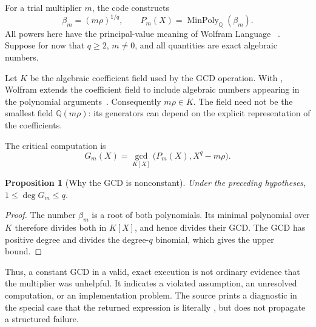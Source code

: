 \documentclass[11pt,letterpaper]{article}
\newcommand{\code}[1]{\texttt{\detokenize{#1}}}
\newcommand{\Q}{\mathbb{Q}}
\newtheorem{proposition}{Proposition}[section]
\theoremstyle{definition}
\begin{document}
For a trial multiplier $m$, the code constructs
\begin{equation}
  \beta_m=(m\rho)^{1/q},
  \qquad P_m(X)=\operatorname{MinPoly}_{\Q}(\beta_m).
  \label{eq:beta}
\end{equation}
All powers here have the principal-value meaning of Wolfram Language
\code{Power}~\cite{doc-power}. Suppose for now that $q\ge2$, $m\ne0$, and all
quantities are exact algebraic numbers.

Let $K$ be the algebraic coefficient field used by the GCD operation. With
\code{Extension -> Automatic}, Wolfram extends the coefficient field to include
algebraic numbers appearing in the polynomial arguments~\cite{doc-gcd}.
Consequently $m\rho\in K$. The field need not be the smallest field $\Q(m\rho)$:
its generators can depend on the explicit representation of the coefficients.

The critical computation is
\begin{equation}
  G_m(X)=\gcd_{K[X]}\bigl(P_m(X),X^q-m\rho\bigr).
  \label{eq:gcd}
\end{equation}

\begin{proposition}[Why the GCD is nonconstant]
Under the preceding hypotheses, $1\le\deg G_m\le q$.
\end{proposition}
\begin{proof}
The number $\beta_m$ is a root of both polynomials. Its minimal polynomial over $K$
therefore divides both in $K[X]$, and hence divides their GCD. The GCD has positive
degree and divides the degree-$q$ binomial, which gives the upper bound.
\end{proof}
Thus, a constant GCD in a valid, exact execution is not ordinary evidence that the
multiplier was unhelpful. It indicates a violated assumption, an unresolved
computation, or an implementation problem. The source prints a diagnostic in the
special case that the returned expression is literally \code{1}, but does not
propagate a structured failure.
\end{document}
